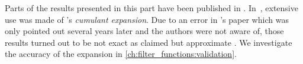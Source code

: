 Parts of the results presented in this part have been published in .
In~, extensive use was made of \citeauthor{Kubo1962}'s \emph{cumulant expansion}.
Due to an error in \citeauthor{Kubo1962}'s paper which was only pointed out several years later  and the authors were not aware of, those results turned out to be not exact as claimed but approximate .
We investigate the accuracy of the expansion in \cref{ch:filter_functions:validation}.
